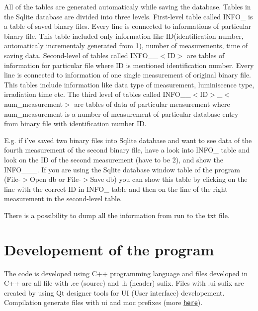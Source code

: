 All of the tables are generated automaticaly while saving the database. Tables in the {\ttfamily Sqlite} database are divided into three levels. First-\/level table called I\-N\-F\-O\-\_ is a table of saved binary files. Every line is connected to informations of particular binary file. This table included only information like I\-D(identification number, automaticaly incrementaly generated from 1), number of measurements, time of saving data. Second-\/level of tables called I\-N\-F\-O\-\_\-\_\-$<$\-I\-D$>$ are tables of information for particular file where I\-D is mentioned identification number. Every line is connected to information of one single measurement of original binary file. This tables include information like data type of measurement, luminiscence type, irradiation time etc. The third level of tables called I\-N\-F\-O\-\_\-\_\-$<$\-I\-D$>$\-\_\-$<$num\-\_\-measurement$>$ are tables of data of particular measurement where num\-\_\-measurement is a number of measurement of particular database entry from binary file with identification number I\-D.\par


E.\-g. if i've saved two binary files into {\ttfamily Sqlite} database and want to see data of the fourth measurement of the second binary file, have a look into {\ttfamily I\-N\-F\-O\-\_} table and look on the I\-D of the second measurement (have to be 2), and show the {\ttfamily I\-N\-F\-O\-\_\-\_\-\_}. If you are using the {\ttfamily Sqlite} database window table of the program ({\ttfamily File-\/$>$Open db} or {\ttfamily File-\/$>$Save db}) you can show this table by clicking on the line with the correct I\-D in I\-N\-F\-O\-\_ table and then on the line of the right measurement in the second-\/level table.

There is a possibility to dump all the information from run to the txt file.\hypertarget{index_devel}{}\section{Developement of the program}\label{index_devel}
The code is developed using C++ programming language and files developed in {\ttfamily C++} are all file with .cc (source) and .h (header) sufix. Files with .ui sufix are created by using Qt designer tools for U\-I (User interface) developement. Compilation generate files with ui and moc prefixes (more \href{http://qt-project.org/doc/qt-4.8/qmake-manual.html}{\tt here}).

